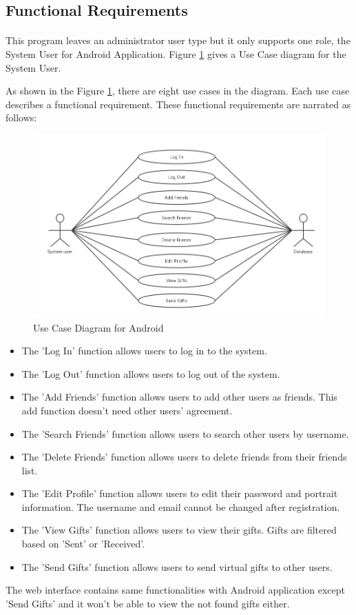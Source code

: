\subsection{Functional Requirements}
\paragraph{}
This program leaves an administrator user type but it only supports one role, the System User for Android Application. Figure \ref{Use Cases Diagram} gives a Use Case diagram for the System User.
\par As shown in the Figure \ref{Use Cases Diagram}, there are eight use cases in the diagram. Each use case describes a functional requirement. These functional requirements are narrated as follows:

\begin{figure}[htb]
\centering
\includegraphics[width=.5\textwidth]{section02/assets/UseCase.png}
\caption[Short Caption 2]{\label{Use Cases Diagram}Use Case Diagram for Android}
\end{figure}

\begin{itemize}
\item The 'Log In' function allows users to log in to the system.
\item The 'Log Out' function allows users to log out of the system.
\item The 'Add Friends' function allows users to add other users as friends. This add function doesn't need other users' agreement.
\item The 'Search Friends' function allows users to search other users by username.
\item The 'Delete Friends' function allows users to delete friends from their friends list.
\item The 'Edit Profile' function allows users to edit their password and portrait information. The username and email cannot be changed after registration. 
\item The 'View Gifts' function allows users to view their gifts. Gifts are filtered based on 'Sent' or 'Received'.
\item The 'Send Gifts' function allows users to send virtual gifts to other users.
\end{itemize}
\par The web interface contains same functionalities with Android application except 'Send Gifts' and it won't be able to view the not found gifts either.



